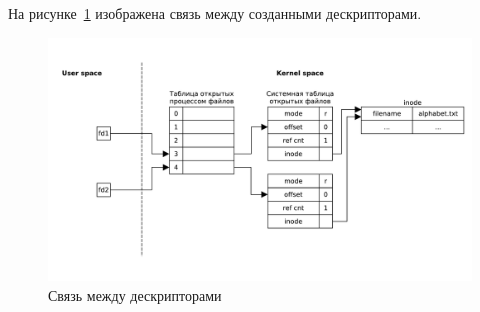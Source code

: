 На рисунке~\ref{pdf:task02} изображена связь между созданными дескрипторами.

\begin{figure}[H]
    \centering
    \includegraphics[scale=0.5]{pdf/task02.pdf}
    \caption{Связь между дескрипторами}\label{pdf:task02}
\end{figure}

